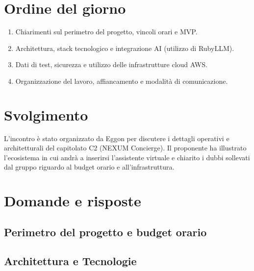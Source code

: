 \documentclass[verbale=esterno]{gpt}
\begin{document}
\section{Ordine del giorno}
\begin{enumerate}
  \item Chiarimenti sul perimetro del progetto, vincoli orari e MVP.
  \item Architettura, stack tecnologico e integrazione AI (utilizzo di RubyLLM).
  \item Dati di test, sicurezza e utilizzo delle infrastrutture cloud AWS.
  \item Organizzazione del lavoro, affiancamento e modalità di comunicazione.
\end{enumerate}

\section{Svolgimento}
L'incontro è stato organizzato da Eggon per discutere i dettagli operativi e architetturali del capitolato C2 (NEXUM Concierge). Il proponente ha illustrato l'ecosistema in cui andrà a inserirsi l'assistente virtuale e chiarito i dubbi sollevati dal gruppo riguardo al budget orario e all'infrastruttura.

\section{Domande e risposte}

\subsection{Perimetro del progetto e budget orario}


\subsection{Architettura e Tecnologie}

\end{document}
